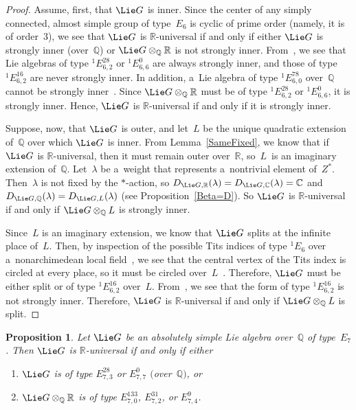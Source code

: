 \documentclass[pdftex]{sigma}
\numberwithin{equation}{section}
\newtheorem{prop}{Proposition}[section]
\begin{document}
\begin{proof}
Assume, f\/irst, that $\Lie G$ is inner.
Since the center of any simply connected, almost simple group of type~$E_6$ is cyclic of prime order (namely, it is of
order~$3$), we see that $\Lie G$ is $\mathbb{R}$-universal if and only if either $\Lie G$ is strongly inner
(over~$\mathbb{Q}$) or $\Lie G \otimes_\mathbb{Q} \mathbb{R}$ is not strongly inner.
From~\cite[\S~6.4.5]{Tits-RepLinIrred}, we see that Lie algebras of type ${}^1 E^{28}_{6,2}$ or ${}^1 E^{0}_{6,6}$ are
always strongly inner, and those of type ${}^1 E^{16}_{6,2}$ are never strongly inner.
In addition, a~Lie algebra of type ${}^1 E^{78}_{6,0}$ over~$\mathbb{Q}$ cannot be strongly inner~\cite[Propositions~4
and~5]{Tits-StronglyInner}.
Since $\Lie G \otimes_\mathbb{Q} \mathbb{R}$ must be of type ${}^1 E^{28}_{6,2}$ or ${}^1 E^{0}_{6,6}$, it is strongly
inner.
Hence, $\Lie G$ is $\mathbb{R}$-universal if and only if it is strongly inner.

Suppose, now, that $\Lie G$ is outer, and let~$L$ be the unique quadratic extension of~$\mathbb{Q}$ over which $\Lie
G$ is inner.
From Lemma~\ref{SameFixed}, we know that if $\Lie G$ is $\mathbb{R}$-universal, then it must remain outer over~$\mathbb{R}$,
so~$L$~is an imaginary extension of~$\mathbb{Q}$.
Let~$\lambda$ be a~weight that represents a~nontrivial element of~$Z^*$.
Then~$\lambda$ is not f\/ixed by the $*$-action, so $D_{\Lie G, \mathbb{R}}(\lambda) = D_{\Lie G, \mathbb{C}}(\lambda) =
\mathbb{C}$ and $D_{\Lie G, \mathbb{Q}}(\lambda) = D_{\Lie G, L}(\lambda)$ (see Proposition~\ref{Beta=D}).
So $\Lie G$ is $\mathbb{R}$-universal if and only if $\Lie G \otimes_\mathbb{Q} L$ is strongly inner.

Since~$L$ is an imaginary extension, we know that $\Lie G$ splits at the inf\/inite place of~$L$.
Then, by inspection of the possible Tits indices of type ${}^1 E_6$ over a~nonarchimedean local
f\/ield~\cite[p.~58]{Tits-Classification}, we see that the central vertex of the Tits index is circled at every place, so
it must be circled over~$L$~\cite[Satz~4.3.3]{Harder-BerichtNeuere}.
Therefore, $\Lie G$ must be either split or of type ${}^1 E_{6,2}^{16}$ over~$L$.
From~\cite[\S~6.4.5]{Tits-RepLinIrred}, we see that the form of type ${}^1 E_{6,2}^{16}$ is not strongly inner.
Therefore, $\Lie G$ is $\mathbb{R}$-universal if and only if $\Lie G \otimes_\mathbb{Q} L$ is split.
\end{proof}

\begin{prop}
Let $\Lie G$ be an absolutely simple Lie algebra over~$\mathbb{Q}$ of type~$E_7$.
Then $\Lie G$ is $\mathbb{R}$-universal if and only if either
\renewcommand{\labelenumi}{{\rm (\theenumi)}}
\begin{enumerate}\itemsep=0pt
\item $\Lie G$ is of type $E^{28}_{7,3}$ or $E^0_{7,7}$ $($over~$\mathbb{Q})$, or
\item $\Lie G \otimes_\mathbb{Q} \mathbb{R}$ is of type $E^{133}_{7,0}$, $E^{31}_{7,2}$, or $E^9_{7,4}$.
\end{enumerate}
\end{prop}
\end{document}
